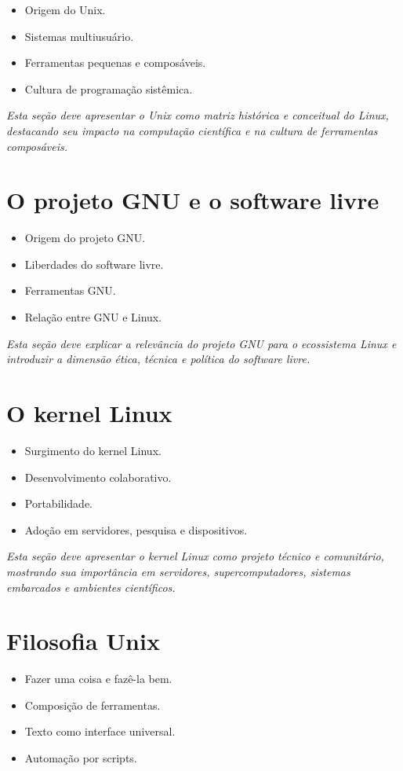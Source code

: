 \documentclass[12pt,openany]{book}
\newcommand{\placeholder}[1]{
    \par\medskip
    \noindent\textit{#1}
    \par\medskip
}
\newcommand{\topicos}[1]{
    \begin{itemize}
        #1
    \end{itemize}
}
\begin{document}
\begin{refsection}
\topicos{
    \item Origem do Unix.
    \item Sistemas multiusuário.
    \item Ferramentas pequenas e composáveis.
    \item Cultura de programação sistêmica.
}

\placeholder{Esta seção deve apresentar o Unix como matriz histórica e conceitual do Linux, destacando seu impacto na computação científica e na cultura de ferramentas composáveis.}

\section{O projeto GNU e o software livre}

\topicos{
    \item Origem do projeto GNU.
    \item Liberdades do software livre.
    \item Ferramentas GNU.
    \item Relação entre GNU e Linux.
}

\placeholder{Esta seção deve explicar a relevância do projeto GNU para o ecossistema Linux e introduzir a dimensão ética, técnica e política do software livre.}

\section{O kernel Linux}

\topicos{
    \item Surgimento do kernel Linux.
    \item Desenvolvimento colaborativo.
    \item Portabilidade.
    \item Adoção em servidores, pesquisa e dispositivos.
}

\placeholder{Esta seção deve apresentar o kernel Linux como projeto técnico e comunitário, mostrando sua importância em servidores, supercomputadores, sistemas embarcados e ambientes científicos.}

\section{Filosofia Unix}

\topicos{
    \item Fazer uma coisa e fazê-la bem.
    \item Composição de ferramentas.
    \item Texto como interface universal.
    \item Automação por scripts.
}


\end{refsection}
\end{document}
